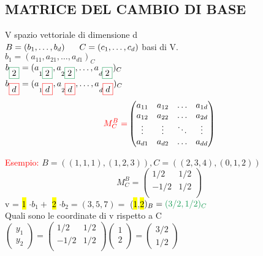 \subsection{MATRICE DEL CAMBIO DI BASE}
\begin{definition}
	V spazio vettoriale di dimensione d \\
	$B = (b_1, \dots, b_d) \hspace{0.6cm} C = (c_1, \dots, c_d)$ basi di V.\\
	$b_{\boxed{1}} = (a_{1\boxed{1}}, a_{2\boxed{1}}, \dots, a_{d\boxed{1}})_C$\\
	$b_{\color{ForestGreen}\boxed{\normalcolor 2}} = (a_{1\color{ForestGreen}\boxed{\normalcolor 2}}, a_{2\color{ForestGreen}\boxed{\normalcolor 2}}, \dots, a_{d\color{ForestGreen}\boxed{\normalcolor 2}})_C$\\
	$b_{\color{red}\boxed{\normalcolor d}} = (a_{1\color{red}\boxed{\normalcolor d}}, a_{2\color{red}\boxed{\normalcolor d}}, \dots, a_{d\color{red}\boxed{\normalcolor d}})_C$\\
	\[
	\textcolor{red}{M^B_{C} =}
	\begin{pmatrix}
		a_{11} & a_{12} & \dots & a_{1d} \\
		a_{12} & a_{22} & \dots & a_{2d} \\
		\vdots & \vdots & \ddots & \vdots \\
		a_{d1} & a_{d2} & \dots & a_{dd} \\
	\end{pmatrix}
	\]
\end{definition}

\textcolor{red}{Esempio: } $B = ((1,1,1),(1,2,3)), C = ((2,3,4),(0,1,2))$\\
\[
M^B_{C} =
\begin{pmatrix}
	1/2 & 1/2 \\
	-1/2 & 1/2 \\
\end{pmatrix}
\]
v = \hl{1} $\cdot b_1 +$ \hl{2} $\cdot b_2 = (3,5,7) =$ (\hl{1},\hl{2}$)_B = \color{ForestGreen} (3/2, 1/2)_C$\\ \normalcolor
\textsf{\small Quali sono le coordinate di v rispetto a C}\\
\(
\begin{pmatrix}
	y_1 \\
	y_2
\end{pmatrix}
=
\begin{pmatrix}
	1/2 & 1/2 \\
	-1/2 & 1/2 \\
\end{pmatrix}
\begin{pmatrix}
	1 \\
	2 \\
\end{pmatrix}
=
\begin{pmatrix}
	3/2 \\
	1/2
\end{pmatrix}
\)

